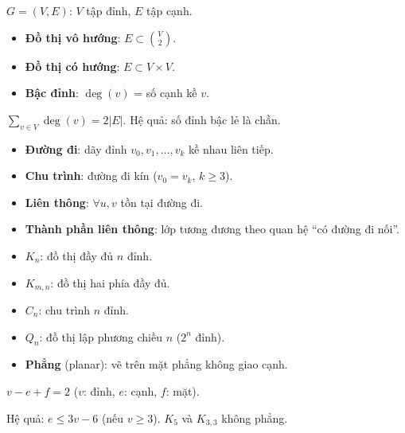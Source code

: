 \documentclass[12pt,a4paper]{article}
\begin{document}
\begin{dinhnghia}[title={Đồ thị}]
  $G = (V, E)$: $V$ tập đỉnh, $E$ tập cạnh.
  \begin{itemize}
    \item \textbf{Đồ thị vô hướng}: $E \subset \binom{V}{2}$.
    \item \textbf{Đồ thị có hướng}: $E \subset V \times V$.
    \item \textbf{Bậc đỉnh}: $\deg(v)$ = số cạnh kề $v$.
  \end{itemize}
\end{dinhnghia}

\begin{dinhly}[title={Bổ đề bắt tay}]
  $\sum_{v \in V} \deg(v) = 2|E|$. Hệ quả: số đỉnh bậc lẻ là chẵn.
\end{dinhly}

\begin{dinhnghia}[title={Đường đi, chu trình, liên thông}]
  \begin{itemize}
    \item \textbf{Đường đi}: dãy đỉnh $v_0, v_1, \ldots, v_k$ kề nhau liên tiếp.
    \item \textbf{Chu trình}: đường đi kín ($v_0 = v_k$, $k \ge 3$).
    \item \textbf{Liên thông}: $\forall u, v$ tồn tại đường đi.
    \item \textbf{Thành phần liên thông}: lớp tương đương theo quan hệ ``có đường đi nối''.
  \end{itemize}
\end{dinhnghia}

\begin{dinhnghia}[title={Đồ thị đặc biệt}]
  \begin{itemize}
    \item $K_n$: đồ thị đầy đủ $n$ đỉnh.
    \item $K_{m,n}$: đồ thị hai phía đầy đủ.
    \item $C_n$: chu trình $n$ đỉnh.
    \item $Q_n$: đồ thị lập phương chiều $n$ ($2^n$ đỉnh).
    \item \textbf{Phẳng} (planar): vẽ trên mặt phẳng không giao cạnh.
  \end{itemize}
\end{dinhnghia}

\begin{dinhly}[title={Công thức Euler (đồ thị phẳng liên thông)}]
  $v - e + f = 2$ ($v$: đỉnh, $e$: cạnh, $f$: mặt).

  Hệ quả: $e \le 3v - 6$ (nếu $v \ge 3$). $K_5$ và $K_{3,3}$ không phẳng.
\end{dinhly}
\end{document}
